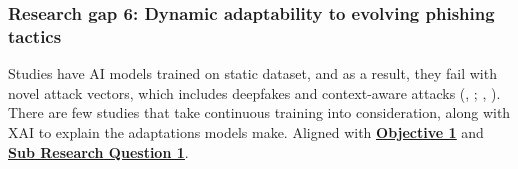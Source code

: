 
\subsubsection*{Research gap 6: Dynamic adaptability to evolving phishing tactics}\label{research-gap-6}
Studies have AI models trained on static dataset, and as a result, they fail with novel attack vectors, which includes deepfakes and context-aware attacks (\citeauthor{kapoor2024comparative}, \citeyear{kapoor2024comparative}; \citeauthor{atlam2022business}, \citeyear{atlam2022business}). There are few studies that take continuous training into consideration, along with XAI to explain the adaptations models make. Aligned with \hyperref[objective-1]{\uline{\textbf{Objective 1}}} and \hyperref[sub-research-q1]{\uline{\textbf{Sub Research Question 1}}}.
